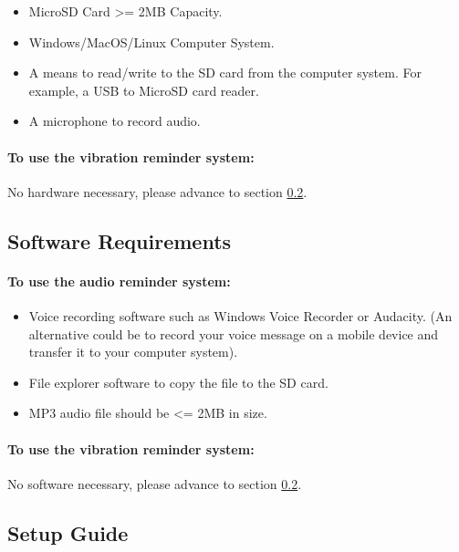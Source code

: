 			\begin{itemize}
				\item MicroSD Card >= 2MB Capacity.
				\item Windows/MacOS/Linux Computer System.
				\item A means to read/write to the SD card from the computer system. For example, a USB to MicroSD card reader.
				\item A microphone to record audio.
			\end{itemize}

			\paragraph{To use the vibration reminder system:}\mbox{}

			No hardware necessary, please advance to section \ref{subsec:quick_start_setup_guide}.

		\subsection{Software Requirements}
		\label{subsec:quick_start_guide_software}

			\paragraph{To use the audio reminder system:}\mbox{}

			\begin{itemize}
				\item Voice recording software such as Windows Voice Recorder or Audacity. (An alternative could be to record your voice message on a mobile device and transfer it to your computer system).
				\item File explorer software to copy the file to the SD card.
				\item MP3 audio file should be <= 2MB in size.
			\end{itemize}

			\paragraph{To use the vibration reminder system:}\mbox{}

			No software necessary, please advance to section \ref{subsec:quick_start_setup_guide}.

		\subsection{Setup Guide}
		\label{subsec:quick_start_setup_guide}

